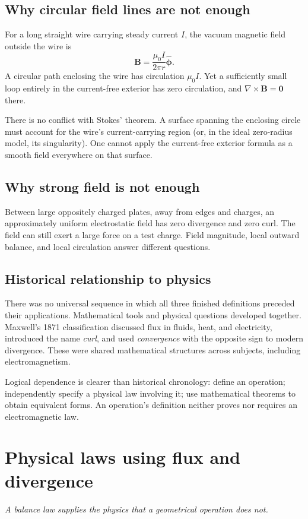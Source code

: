 \documentclass[11pt,letterpaper]{article}
\newcommand{\vect}[1]{\boldsymbol{#1}}
\newcommand{\topic}[2]{\section{#1}\textit{#2}\par}
\begin{document}
\subsection*{Why circular field lines are not enough}
For a long straight wire carrying steady current $I$, the vacuum magnetic field outside the wire is
\[
\vect B=\frac{\mu_0 I}{2\pi r}\hat{\vect\phi}.
\]
A circular path enclosing the wire has circulation $\mu_0 I$. Yet a sufficiently small loop entirely in the current-free exterior has zero circulation, and $\nabla\times\vect B=\vect0$ there.

There is no conflict with Stokes' theorem. A surface spanning the enclosing circle must account for the wire's current-carrying region (or, in the ideal zero-radius model, its singularity). One cannot apply the current-free exterior formula as a smooth field everywhere on that surface.\cite{ampere}

\subsection*{Why strong field is not enough}
Between large oppositely charged plates, away from edges and charges, an approximately uniform electrostatic field has zero divergence and zero curl. The field can still exert a large force on a test charge. Field magnitude, local outward balance, and local circulation answer different questions.

\subsection*{Historical relationship to physics}
There was no universal sequence in which all three finished definitions preceded their applications. Mathematical tools and physical questions developed together. Maxwell's 1871 classification discussed flux in fluids, heat, and electricity, introduced the name \emph{curl}, and used \emph{convergence} with the opposite sign to modern divergence. These were shared mathematical structures across subjects, including electromagnetism.\cite{history}

Logical dependence is clearer than historical chronology: define an operation; independently specify a physical law involving it; use mathematical theorems to obtain equivalent forms. An operation's definition neither proves nor requires an electromagnetic law.

\newpage
\topic{Physical laws using flux and divergence}{A balance law supplies the physics that a geometrical operation does not.}
\end{document}
